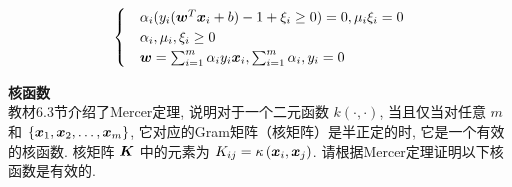 \documentclass[answers]{exam}  %
\begin{document}
\begin{questions}
\begin{solution}
\begin{enumerate}
$$\begin{cases}
                           & \alpha_i(y_i(\boldsymbol{w}^T{\boldsymbol{x}}_i+b)-1+\xi_i\geq 0)=0,\mu_i\xi_i=0        \\
                           & \alpha_i,\mu_i,\xi_i\geq 0                                      \\
                           & \boldsymbol{w}=\sum_{i=1}^{m}\alpha_iy_i{\boldsymbol{x}}_i,\sum_{i=1}^{m}\alpha_i,y_i=0
                      \end{cases}
                  $$
        \end{enumerate}
    \end{solution}
    \question [20] \textbf{核函数} \\
    教材6.3节介绍了Mercer定理, 说明对于一个二元函数 $k(\cdot, \cdot)$, 当且仅当对任意 $m$ 和 $\{{\boldsymbol{x}}_{1}, {\boldsymbol{x}}_{2}, \ldots, {\boldsymbol{x}}_{m}\}$, 它对应的Gram矩阵（核矩阵）是半正定的时, 它是一个有效的核函数. 核矩阵 $\boldsymbol{K}$ 中的元素为 $K_{i j}=\kappa\left({\boldsymbol{x}}_{i}, {\boldsymbol{x}}_{j}\right)$. 请根据Mercer定理证明以下核函数是有效的.


\end{questions}
\end{document}
